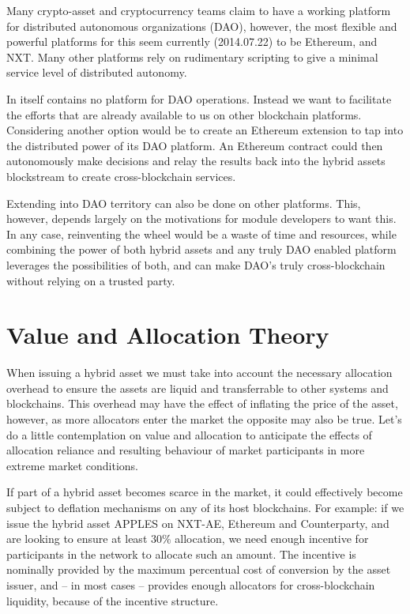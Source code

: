 \documentclass[a4paper]{article}
\begin{document}
Many crypto-asset and cryptocurrency teams claim to have a working platform for distributed autonomous organizations (DAO), however, the most flexible and powerful platforms for this seem currently (2014.07.22) to be Ethereum, and NXT. Many other platforms rely on rudimentary scripting to give a minimal service level of distributed autonomy.

In itself \hybridd contains no platform for DAO operations. Instead we want to facilitate the efforts that are already available to us on other blockchain platforms. Considering another option would be to create an Ethereum extension to tap into the distributed power of its DAO platform. An Ethereum contract could then autonomously make decisions and relay the results back into the hybrid assets blockstream to create cross-blockchain services.

Extending into DAO territory can also be done on other platforms. This, however, depends largely on the motivations for module developers to want this. In any case, reinventing the wheel would be a waste of time and resources, while combining the power of both hybrid assets and any truly DAO enabled platform leverages the possibilities of both, and can make DAO's truly cross-blockchain without relying on a trusted party.


\section{Value and Allocation Theory}

When issuing a hybrid asset we must take into account the necessary allocation overhead to ensure the assets are liquid and transferrable to other systems and blockchains. This overhead may have the effect of inflating the price of the asset, however, as more allocators enter the market the opposite may also be true. Let's do a little contemplation on value and allocation to anticipate the effects of allocation reliance and resulting behaviour of market participants in more extreme market conditions.

If part of a hybrid asset becomes scarce in the market, it could effectively become subject to deflation mechanisms on any of its host blockchains. For example: if we issue the hybrid asset APPLES on NXT-AE, Ethereum and Counterparty\cite{counterparty}, and are looking to ensure at least $30\%$ allocation, we need enough incentive for participants in the network to allocate such an amount. The incentive is nominally provided by the maximum percentual cost of conversion by the asset issuer, and – in most cases – provides enough allocators for cross-blockchain liquidity, because of the incentive structure.
\end{document}
